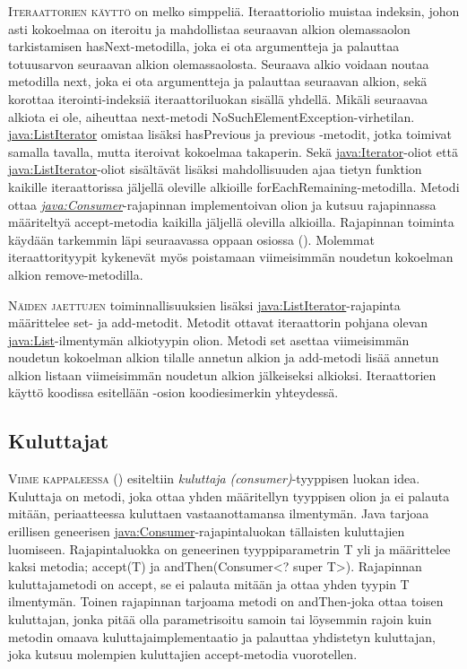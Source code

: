\documentclass[openany]{book}
\newcommand{\newthought}[1]{\smallskip\textsc{#1}}
\newcommand{\eng}[1]{\textit{(#1)}}
\newcommand{\new}[1]{\textit{\gls{#1}}}
\newcommand{\neweng}[2]{\new{#1} \eng{#2}}
\newcommand{\java}[1]{\underline{\gls{java:#1}}}
\newcommand{\newjava}[1]{\textit{\java{#1}}}
\begin{document}
\newthought{Iteraattorien käyttö} on melko simppeliä. Iteraattoriolio muistaa indeksin, johon
asti kokoelmaa on iteroitu ja mahdollistaa seuraavan alkion olemassaolon tarkistamisen
hasNext-metodilla, joka ei ota argumentteja ja palauttaa totuusarvon seuraavan alkion
olemassaolosta. Seuraava alkio voidaan noutaa metodilla next, joka ei ota argumentteja ja
palauttaa seuraavan alkion, sekä korottaa iterointi-indeksiä iteraattoriluokan sisällä
yhdellä. Mikäli seuraavaa alkiota ei ole, aiheuttaa next-metodi
NoSuchElementException-virhetilan. \java{ListIterator} omistaa lisäksi hasPrevious ja previous
-metodit, jotka toimivat samalla tavalla, mutta iteroivat kokoelmaa takaperin. Sekä
\java{Iterator}-oliot että \java{ListIterator}-oliot sisältävät lisäksi mahdollisuuden ajaa
tietyn funktion kaikille iteraattorissa jäljellä oleville alkioille forEachRemaining-metodilla.
Metodi ottaa \newjava{Consumer}-rajapinnan implementoivan olion ja kutsuu rajapinnassa
määriteltyä accept-metodia kaikilla jäljellä olevilla alkioilla. Rajapinnan toiminta käydään
tarkemmin läpi seuraavassa oppaan osiossa (). Molemmat iteraattorityypit
kykenevät myös poistamaan viimeisimmän noudetun kokoelman alkion remove-metodilla.

\newthought{Näiden jaettujen} toiminnallisuuksien lisäksi \java{ListIterator}-rajapinta
määrittelee set- ja add-metodit. Metodit ottavat iteraattorin pohjana olevan 
\java{List}-ilmentymän alkiotyypin olion. Metodi set asettaa viimeisimmän noudetun kokoelman
alkion tilalle annetun alkion ja add-metodi lisää annetun alkion listaan viimeisimmän noudetun
alkion jälkeiseksi alkioksi. Iteraattorien käyttö koodissa esitellään -osion
koodiesimerkin yhteydessä.

\subsection{Kuluttajat}
\label{consumers}

\newthought{Viime kappaleessa} () esiteltiin
\neweng{kuluttaja}{consumer}-tyyppisen luokan idea. Kuluttaja on metodi, joka ottaa yhden
määritellyn tyyppisen olion ja ei palauta mitään, periaatteessa kuluttaen vastaanottamansa
ilmentymän. Java tarjoaa erillisen geneerisen \java{Consumer}-rajapintaluokan tällaisten
kuluttajien luomiseen. Rajapintaluokka on geneerinen tyyppiparametrin T yli ja määrittelee kaksi
metodia; accept(T) ja andThen(Consumer<? super T>). Rajapinnan kuluttajametodi on accept, se ei
palauta mitään ja ottaa yhden tyypin T ilmentymän. Toinen rajapinnan tarjoama metodi on
andThen-joka ottaa toisen kuluttajan, jonka pitää olla parametrisoitu samoin tai löysemmin rajoin
kuin metodin omaava kuluttajaimplementaatio ja palauttaa yhdistetyn kuluttajan, joka kutsuu
molempien kuluttajien accept-metodia vuorotellen.
\end{document}
